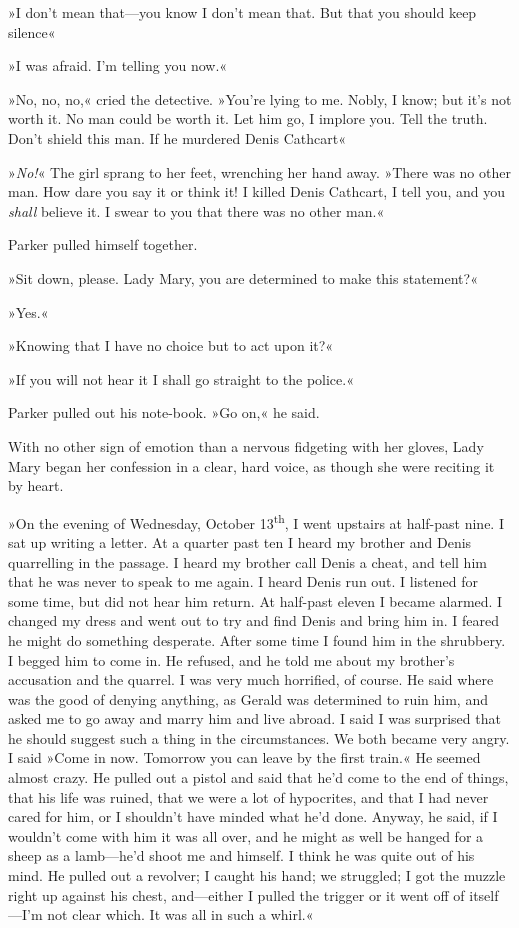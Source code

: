»I don't mean that\allowbreak---\allowbreak you know I don't mean that. But that you should keep silence\longdash«

»I was afraid. I'm telling you now.«

»No, no, no,« cried the detective. »You're lying to me. Nobly, I know; but it's not worth it. No man could be worth it. Let him go, I implore you. Tell the truth. Don't shield this man. If he murdered Denis Cathcart\longdash«

»\textit{No!}« The girl sprang to her feet, wrenching her hand away. »There was no other man. How dare you say it or think it! I killed Denis Cathcart, I tell you, and you \textit{shall} believe it. I swear to you that there was no other man.«

Parker pulled himself together.

»Sit down, please. Lady Mary, you are determined to make this statement?«

»Yes.«

»Knowing that I have no choice but to act upon it?«

»If you will not hear it I shall go straight to the police.«

Parker pulled out his note-book. »Go on,« he said.

With no other sign of emotion than a nervous fidgeting with her gloves, Lady Mary began her confession in a clear, hard voice, as though she were reciting it by heart.

»On the evening of Wednesday, October 13\textsuperscript{th}, I went upstairs at half-past nine. I sat up writing a letter. At a quarter past ten I heard my brother and Denis quarrelling in the passage. I heard my brother call Denis a cheat, and tell him that he was never to speak to me again. I heard Denis run out. I listened for some time, but did not hear him return. At half-past eleven I became alarmed. I changed my dress and went out to try and find Denis and bring him in. I feared he might do something desperate. After some time I found him in the shrubbery. I begged him to come in. He refused, and he told me about my brother's accusation and the quarrel. I was very much horrified, of course. He said where was the good of denying anything, as Gerald was determined to ruin him, and asked me to go away and marry him and live abroad. I said I was surprised that he should suggest such a thing in the circumstances. We both became very angry. I said »Come in now.  Tomorrow you can leave by the first train.« He seemed almost crazy. He pulled out a pistol and said that he'd come to the end of things, that his life was ruined, that we were a lot of hypocrites, and that I had never cared for him, or I shouldn't have minded what he'd done. Anyway, he said, if I wouldn't come with him it was all over, and he might as well be hanged for a sheep as a lamb\allowbreak---\allowbreak he'd shoot me and himself. I think he was quite out of his mind. He pulled out a revolver; I caught his hand; we struggled; I got the muzzle right up against his chest, and\allowbreak---\allowbreak either I pulled the trigger or it went off of itself\allowbreak---\allowbreak I'm not clear which. It was all in such a whirl.«


